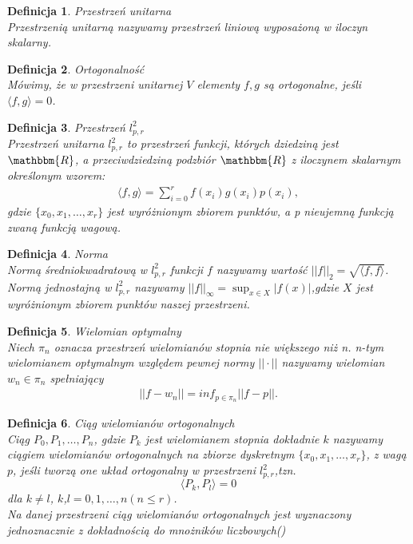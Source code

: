\documentclass[12pt,wide]{mwart}
\newtheorem{defin}{Definicja}
\begin{document}
\begin{defin}{Przestrzeń unitarna}\\
Przestrzenią unitarną nazywamy przestrzeń liniową wyposażoną w iloczyn skalarny.
\end{defin}

\begin{defin}{Ortogonalność}\\
Mówimy, że w przestrzeni unitarnej $V$ elementy $f,g$ są ortogonalne, jeśli $\langle f,g \rangle = 0$. 
\end{defin}

\begin{defin}{Przestrzeń $l^2_{p,r}$}\\
Przestrzeń unitarna $l^2_{p,r}$ to przestrzeń funkcji, których dziedziną jest $\mathbbm{R}$, a przeciwdziedziną podzbiór $\mathbbm{R}$ z iloczynem skalarnym określonym wzorem:
\begin{eqnarray*}
	\langle  f,g \rangle = \sum^r_{i=0} f(x_i)g(x_i)p(x_i),
\end{eqnarray*}
gdzie $\{x_0,x_1,\ldots,x_r\}$ jest wyróżnionym zbiorem punktów, a p nieujemną funkcją zwaną funkcją wagową.
\end{defin}

\begin{defin}{Norma}\\
Normą średniokwadratową w $l^2_{p,r}$ funkcji $f$ nazywamy wartość $||f||_2 = \sqrt{\langle f,f \rangle}$. Normą jednostajną w $l^2_{p,r}$ nazywamy $||f||_\infty = \sup_{x \in X} |f(x)|$,gdzie $X$ jest wyróżnionym zbiorem punktów naszej przestrzeni.
\end{defin}

\begin{defin}{Wielomian optymalny}\\
Niech $\pi_n$ oznacza przestrzeń wielomianów stopnia nie większego niż n. n-tym wielomianem optymalnym względem pewnej normy $|| \cdot ||$ nazywamy wielomian $w_n \in \pi_n$ spełniający
\begin{eqnarray*}
||f-w_n|| = inf_{p \in \pi_n} ||f -p||.
\end{eqnarray*}
\end{defin}

\begin{defin}{Ciąg wielomianów ortogonalnych}\\
Ciąg $P_0,P_1,\ldots,P_n$, gdzie $P_k$ jest wielomianem stopnia dokładnie $k$ nazywamy ciągiem wielomianów ortogonalnych na zbiorze dyskretnym $\{x_0,x_1,\ldots,x_r\}$, z wagą $p$, jeśli tworzą one układ ortogonalny w przestrzeni $l^2_{p,r}$,tzn.
$$
	\langle  P_k,P_l \rangle = 0
$$
dla $k \neq l$, $k$,$l = 0,1,\ldots,n ( n \leq r)$.\\
Na danej przestrzeni ciąg wielomianów ortogonalnych jest wyznaczony jednoznacznie z dokładnością do mnożników liczbowych(\cite[strona 93]{JMJ})
\end{defin}
\end{document}
